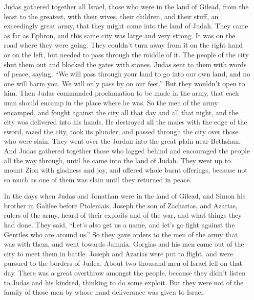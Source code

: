  Judas gathered together all Israel, those who were in the
land of Gilead, from the least to the greatest, with their wives, their
children, and their stuff, an exceedingly great army, that they might
come into the land of Judah.  They came as far as Ephron,
and this same city was large and very strong. It was on the road where
they were going. They couldn't turn away from it on the right hand or on
the left, but needed to pass through the middle of it.  The
people of the city shut them out and blocked the gates with stones.
 Judas sent to them with words of peace, saying, ``We will
pass through your land to go into our own land, and no one will harm
you. We will only pass by on our feet.'' But they wouldn't open to him.
 Then Judas commanded proclamation to be made in the army,
that each man should encamp in the place where he was.  So
the men of the army encamped, and fought against the city all that day
and all that night, and the city was delivered into his hands.
 He destroyed all the males with the edge of the sword,
razed the city, took its plunder, and passed through the city over those
who were slain.  They went over the Jordan into the great
plain near Bethshan.  And Judas gathered together those who
lagged behind and encouraged the people all the way through, until he
came into the land of Judah.  They went up to mount Zion
with gladness and joy, and offered whole burnt offerings, because not so
much as one of them was slain until they returned in peace.

 In the days when Judas and Jonathan were in the land of
Gilead, and Simon his brother in Galilee before Ptolemais, 
Joseph the son of Zacharias, and Azarias, rulers of the army, heard of
their exploits and of the war, and what things they had done.
 They said, ``Let's also get us a name, and let's go fight
against the Gentiles who are around us.''  So they gave
orders to the men of the army that was with them, and went towards
Jamnia.  Gorgias and his men came out of the city to meet
them in battle.  Joseph and Azarias were put to flight, and
were pursued to the borders of Judea. About two thousand men of Israel
fell on that day.  There was a great overthrow amongst the
people, because they didn't listen to Judas and his kindred, thinking to
do some exploit.  But they were not of the family of those
men by whose hand deliverance was given to Israel.

